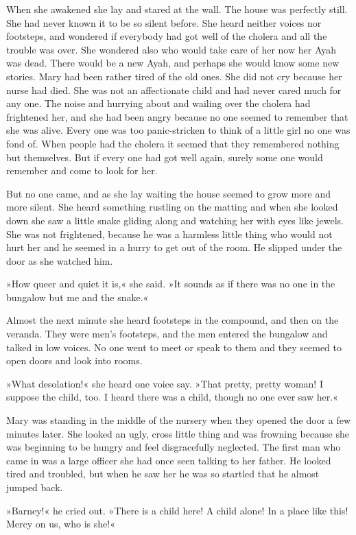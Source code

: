 When she awakened she lay and stared at the wall. The house was perfectly still. She had never known it to be so silent before. She heard neither voices nor footsteps, and wondered if everybody had got well of the cholera and all the trouble was over. She wondered also who would take care of her now her Ayah was dead. There would be a new Ayah, and perhaps she would know some new stories. Mary had been rather tired of the old ones. She did not cry because her nurse had died. She was not an affectionate child and had never cared much for any one. The noise and hurrying about and wailing over the cholera had frightened her, and she had been angry because no one seemed to remember that she was alive. Every one was too panic-stricken to think of a little girl no one was fond of. When people had the cholera it seemed that they remembered nothing but themselves. But if every one had got well again, surely some one would remember and come to look for her.

But no one came, and as she lay waiting the house seemed to grow more and more silent. She heard something rustling on the matting and when she looked down she saw a little snake gliding along and watching her with eyes like jewels. She was not frightened, because he was a harmless little thing who would not hurt her and he seemed in a hurry to get out of the room. He slipped under the door as she watched him.

»How queer and quiet it is,« she said. »It sounds as if there was no one in the bungalow but me and the snake.«

Almost the next minute she heard footsteps in the compound, and then on the veranda. They were men's footsteps, and the men entered the bungalow and talked in low voices. No one went to meet or speak to them and they seemed to open doors and look into rooms.

»What desolation!« she heard one voice say. »That pretty, pretty woman! I suppose the child, too. I heard there was a child, though no one ever saw her.«

Mary was standing in the middle of the nursery when they opened the door a few minutes later. She looked an ugly, cross little thing and was frowning because she was beginning to be hungry and feel disgracefully neglected. The first man who came in was a large officer she had once seen talking to her father. He looked tired and troubled, but when he saw her he was so startled that he almost jumped back.

»Barney!« he cried out. »There is a child here! A child alone! In a place like this! Mercy on us, who is she!«

